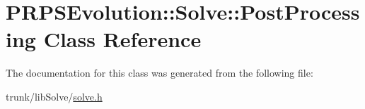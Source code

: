 \hypertarget{class_p_r_p_s_evolution_1_1_solve_1_1_post_processing}{\section{P\-R\-P\-S\-Evolution\-:\-:Solve\-:\-:Post\-Processing Class Reference}
\label{class_p_r_p_s_evolution_1_1_solve_1_1_post_processing}
}


The documentation for this class was generated from the following file\-:\begin{DoxyCompactItemize}
\item 
trunk/lib\-Solve/\hyperlink{solve_8h}{solve.\-h}\end{DoxyCompactItemize}
